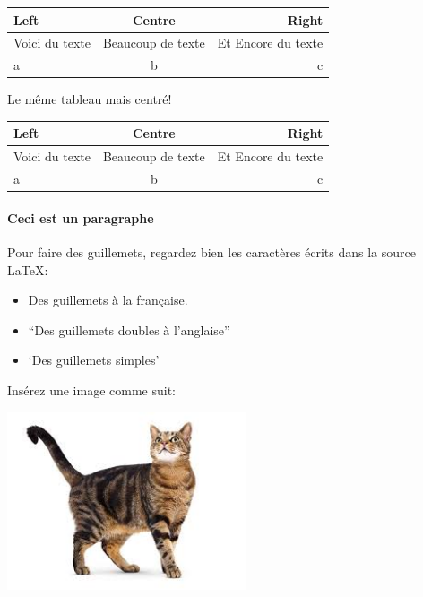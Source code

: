 \documentclass[paper=a4, fontsize=11pt]{article}
\begin{document}
\begin{tabular}{lcr} %
\toprule
Left & Centre & Right \\
\midrule
Voici du texte & Beaucoup de texte & Et Encore du texte \\
a & b & c \\
\bottomrule
\end{tabular}

\vspace{0.5cm} %

Le même tableau mais centré!

\begin{center}
\begin{tabular}{lcr} %
\toprule
Left & Centre & Right \\
\midrule
Voici du texte & Beaucoup de texte & Et Encore du texte \\
a & b & c \\
\bottomrule
\end{tabular}
\end{center}

\paragraph{Ceci est un paragraphe}
Pour faire des guillemets, regardez bien les caractères écrits dans la source \LaTeX: 
\begin{itemize}
\item \og Des guillemets à la française\fg{}.
\item ``Des guillemets doubles à l'anglaise''
\item `Des guillemets simples'
\end{itemize}

\vspace{0.5cm} %

Insérez une image comme suit:

\includegraphics[width=200pt]{myimage.jpg} %
\end{document}
